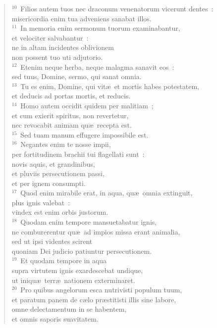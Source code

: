 \begin{flushleft}
\begin{verse}
${}^{10}$~Filios autem tuos nec draconum venenatorum vicerunt dentes~:\\ misericordia enim tua adveniens sanabat illos.\\
${}^{11}$~In memoria enim sermonum tuorum examinabantur,\\ et velociter salvabantur~:\\ ne in altam incidentes oblivionem\\ non possent tuo uti adjutorio.\\
${}^{12}$~Etenim neque herba, neque malagma sanavit eos~:\\ sed tuus, Domine, sermo, qui sanat omnia.\\
${}^{13}$~Tu es enim, Domine, qui vit\ae\ et mortis habes potestatem,\\ et deducis ad portas mortis, et reducis.\\
${}^{14}$~Homo autem occidit quidem per malitiam~;\\ et cum exierit spiritus, non revertetur,\\ nec revocabit animam qu\ae\ recepta est.\\
${}^{15}$~Sed tuam manum effugere impossibile est.\\
${}^{16}$~Negantes enim te nosse impii,\\ per fortitudinem brachii tui flagellati sunt~:\\ novis aquis, et grandinibus,\\ et pluviis persecutionem passi,\\ et per ignem consumpti.\\
${}^{17}$~Quod enim mirabile erat, in aqua, qu\ae\ omnia extinguit,\\ plus ignis valebat~:\\ vindex est enim orbis justorum.\\
${}^{18}$~Quodam enim tempore mansuetabatur ignis,\\ ne comburerentur qu\ae\ ad impios missa erant animalia,\\ sed ut ipsi videntes scirent\\ quoniam Dei judicio patiuntur persecutionem.\\
${}^{19}$~Et quodam tempore in aqua\\ supra virtutem ignis exardescebat undique,\\ ut iniqu\ae\ terr\ae\ nationem exterminaret.\\
${}^{20}$~Pro quibus angelorum esca nutrivisti populum tuum,\\ et paratum panem de c\ae lo pr\ae stitisti illis sine labore,\\ omne delectamentum in se habentem,\\ et omnis saporis suavitatem.\\

\end{verse}
\end{flushleft}
